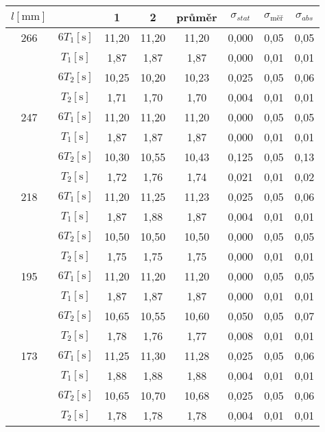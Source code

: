 \begin{tabular}{cccccccc}																																		\toprule
$l [\si{\milli\metre}]$	&							&	1		&	2		&	průměr	&	$\sigma_{stat}$	&	$\sigma_{\text{měř}}$	&	$\sigma_{abs}$	\\	\midrule
266						&	$6 T_1 [\si{\second}]$	&	11,20	&	11,20	&	11,20	&	0,000			&	0,05					&	0,05			\\	
						&	$  T_1 [\si{\second}]$	&	1,87	&	1,87	&	1,87	&	0,000			&	0,01					&	0,01			\\
						&	$6 T_2 [\si{\second}]$	&	10,25	&	10,20	&	10,23	&	0,025			&	0,05					&	0,06			\\
						&	$  T_2 [\si{\second}]$	&	1,71	&	1,70	&	1,70	&	0,004			&	0,01					&	0,01			\\	\midrule
247						&	$6 T_1 [\si{\second}]$	&	11,20	&	11,20	&	11,20	&	0,000			&	0,05					&	0,05			\\
						&	$  T_1 [\si{\second}]$	&	1,87	&	1,87	&	1,87	&	0,000			&	0,01					&	0,01			\\
						&	$6 T_2 [\si{\second}]$	&	10,30	&	10,55	&	10,43	&	0,125			&	0,05					&	0,13			\\
						&	$  T_2 [\si{\second}]$	&	1,72	&	1,76	&	1,74	&	0,021			&	0,01					&	0,02			\\	\midrule
218						&	$6 T_1 [\si{\second}]$	&	11,20	&	11,25	&	11,23	&	0,025			&	0,05					&	0,06			\\
						&	$  T_1 [\si{\second}]$	&	1,87	&	1,88	&	1,87	&	0,004			&	0,01					&	0,01			\\
						&	$6 T_2 [\si{\second}]$	&	10,50	&	10,50	&	10,50	&	0,000			&	0,05					&	0,05			\\
						&	$  T_2 [\si{\second}]$	&	1,75	&	1,75	&	1,75	&	0,000			&	0,01					&	0,01			\\	\midrule
195						&	$6 T_1 [\si{\second}]$	&	11,20	&	11,20	&	11,20	&	0,000			&	0,05					&	0,05			\\
						&	$  T_1 [\si{\second}]$	&	1,87	&	1,87	&	1,87	&	0,000			&	0,01					&	0,01			\\
						&	$6 T_2 [\si{\second}]$	&	10,65	&	10,55	&	10,60	&	0,050			&	0,05					&	0,07			\\
						&	$  T_2 [\si{\second}]$	&	1,78	&	1,76	&	1,77	&	0,008			&	0,01					&	0,01			\\	\midrule
173						&	$6 T_1 [\si{\second}]$	&	11,25	&	11,30	&	11,28	&	0,025			&	0,05					&	0,06			\\
						&	$  T_1 [\si{\second}]$	&	1,88	&	1,88	&	1,88	&	0,004			&	0,01					&	0,01			\\
						&	$6 T_2 [\si{\second}]$	&	10,65	&	10,70	&	10,68	&	0,025			&	0,05					&	0,06			\\
						&	$  T_2 [\si{\second}]$	&	1,78	&	1,78	&	1,78	&	0,004			&	0,01					&	0,01			\\	\bottomrule

\end{tabular}